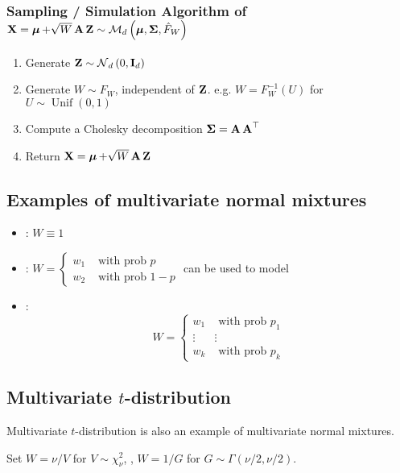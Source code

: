 \subsubsection*{Sampling / Simulation Algorithm of $\X=\mmu+\sqrt{W} \A \Z \sim \M_{d}\left(\mmu, \mSigma, \hat{F}_{W}\right)$}
\begin{enumerate}[label = (\arabic*), leftmargin=*]
    \item Generate $\Z \sim \N_{d}\left(0, \I_{d}\right)$
    \item Generate $W \sim F_{W}$, independent of $\Z$. e.g. $W=F_{W}^{-1}(U)$ for $U \sim \operatorname{Unif}(0,1)$
    \item Compute a Cholesky decomposition $\mSigma=\A \A^{\T}$
    \item Return $\X=\mmu+\sqrt{W} \A \Z$
\end{enumerate}







\subsection*{Examples of multivariate normal mixtures}
\begin{itemize}[leftmargin=*]
    \item {}: $W \equiv 1$
    \item {}:
$
W= \begin{cases}w_{1} & \text { with prob } p \\ w_{2} & \text { with prob } 1-p\end{cases}
$
can be used to model 
    \item {}:
$$
W=\left\{\begin{array}{cc}
w_{1} & \text { with prob } p_{1} \\
\vdots & \vdots \\
w_{k} & \text { with prob } p_{k}
\end{array}\right.
$$
\end{itemize}


\subsection*{Multivariate $t$-distribution}
Multivariate $t$-distribution is also an example of multivariate normal mixtures.

Set $W=\nu / V$ for $V \sim \chi_{\nu}^{2}$, , $W=1 / G$ for $G \sim \Gamma(\nu / 2, \nu / 2)$. 

